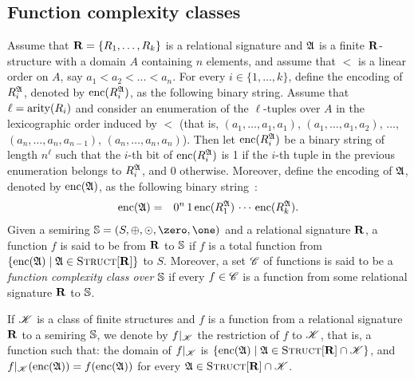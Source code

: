 \subsection{Function complexity classes}
Assume that $\mathbf{R} = \{R_1, \ldots, R_k\}$ is a relational signature and $\mathfrak{A}$ is a finite $\mathbf{R}$-structure with a domain $A$ containing $n$ elements, and assume that  $<$ is a linear order on $A$, say $a_1 < a_2 < \ldots < a_n$. For every $i \in \{1, \ldots, k\}$, define the encoding of $R_i^{\mathfrak{A}}$, denoted by ${\rm enc}(R_i^{\mathfrak{A}})$, as the following binary string. Assume that $\ell = {\rm arity}(R_i)$ and consider an enumeration of the $\ell$-tuples over $A$ in the lexicographic order induced by $<$ (that is, $(a_1, \ldots, a_1, a_1)$, $(a_1, \ldots, a_1, a_2)$, $\ldots$, $(a_n, \ldots, a_n, a_{n-1})$, $(a_n, \ldots, a_n, a_n)$). Then let ${\rm enc}(R_i^{\mathfrak{A}})$ be a binary string of length $n^\ell$ such that the $i$-th bit of ${\rm enc}(R_i^{\mathfrak{A}})$ is 1 if the $i$-th tuple in the previous enumeration belongs to $R_i^{\mathfrak{A}}$, and 0 otherwise. Moreover, define the encoding of $\mathfrak{A}$, denoted by ${\rm enc}(\mathfrak{A})$, as the following binary string~\cite{L04}:
\begin{eqnarray*}
{\rm enc}(\mathfrak{A}) & = & 0^n \, 1 \, {\rm enc}(R_1^{\mathfrak{A}}) \, \cdots \, {\rm enc}(R_k^{\mathfrak{A}}).
\end{eqnarray*}
Given a semiring $\SR = (S, \adds, \mults, \zero, \one)$ and a relational signature $\mathbf{R}$, a function $f$ is said to be from $\mathbf{R}$ to $\mathbb{S}$ if $f$ is a total function from $\{{\rm enc}(\mathfrak{A}) \mid \mathfrak{A} \in \text{\sc Struct}[\mathbf{R}]\}$ to $S$. Moreover, a set $\mathscr{C}$ of functions is said to be a {\em function complexity class over $\mathbb{S}$} if every $f \in \mathscr{C}$ is a function from some relational signature $\mathbf{R}$ to $\mathbb{S}$.

If $\mathscr{K}$ is a class of finite structures and $f$ is a function from a relational signature $\mathbf{R}$ to a semiring $\mathbb{S}$, we denote by $f|_{\mathscr{K}}$ the restriction of $f$ to $\mathscr{K}$, that is, a function such that: the domain of $f|_{\mathscr{K}}$ is $\{ {\rm enc}(\mathfrak{A}) \mid \mathfrak{A} \in \text{\sc Struct}[\mathbf{R}] \cap \mathscr{K}\}$, and 
$f|_{\mathscr{K}}({\rm enc}(\mathfrak{A})) = f({\rm enc}(\mathfrak{A}))$ for every $\mathfrak{A} \in \text{\sc Struct}[\mathbf{R}] \cap \mathscr{K}$. 

